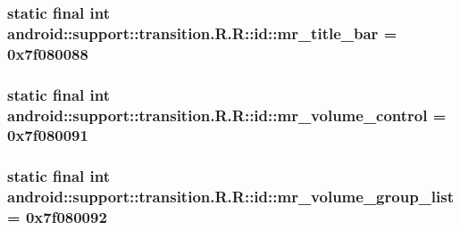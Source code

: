 \hypertarget{classandroid_1_1support_1_1transition_1_1_r_1_1id_33940d08951e31aea3c4f6ccecfb8f30}{
\subsubsection[{mr\_\-title\_\-bar}]{\setlength{\rightskip}{0pt plus 5cm}static final int android::support::transition.R.R::id::mr\_\-title\_\-bar = 0x7f080088}}
\label{classandroid_1_1support_1_1transition_1_1_r_1_1id_33940d08951e31aea3c4f6ccecfb8f30}


\hypertarget{classandroid_1_1support_1_1transition_1_1_r_1_1id_3c2f3f9c1ba179fa41fc6b0e98902042}{
\subsubsection[{mr\_\-volume\_\-control}]{\setlength{\rightskip}{0pt plus 5cm}static final int android::support::transition.R.R::id::mr\_\-volume\_\-control = 0x7f080091}}
\label{classandroid_1_1support_1_1transition_1_1_r_1_1id_3c2f3f9c1ba179fa41fc6b0e98902042}


\hypertarget{classandroid_1_1support_1_1transition_1_1_r_1_1id_9c1786c8df1e54606cd3941dc7a68df1}{
\subsubsection[{mr\_\-volume\_\-group\_\-list}]{\setlength{\rightskip}{0pt plus 5cm}static final int android::support::transition.R.R::id::mr\_\-volume\_\-group\_\-list = 0x7f080092}}
\label{classandroid_1_1support_1_1transition_1_1_r_1_1id_9c1786c8df1e54606cd3941dc7a68df1}


